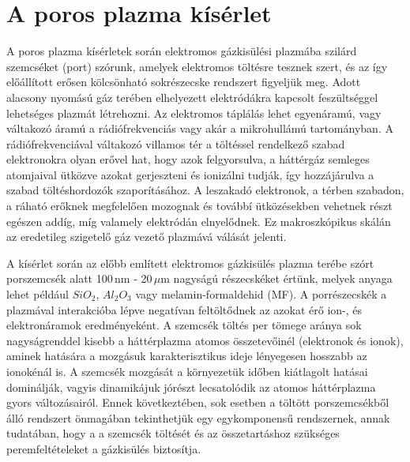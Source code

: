 \chapter{A poros plazma kísérlet}


	A poros plazma kísérletek során elektromos gázkisülési
        plazmába szilárd szemcséket (port) szórunk, amelyek
        elektromos töltésre tesznek szert, és az így
        előállított erősen kölcsönható sokrészecske rendszert
        figyeljük meg. Adott alacsony nyomású gáz terében elhelyezett
        elektródákra kapcsolt feszültséggel  
	lehetséges plazmát létrehozni. Az elektromos táplálás lehet
        egyenáramú, vagy váltakozó áramú a rádiófrekvenciás vagy akár
        a mikrohullámú tartományban. A rádiófrekvenciával váltakozó
        villamos tér a töltéssel rendelkező szabad elektronokra 
	olyan erővel hat, hogy azok felgyorsulva, a háttérgáz semleges
        atomjaival ütközve azokat gerjeszteni és ionizálni tudják, így
        hozzájárulva a szabad töltéshordozók szaporításához.
	A leszakadó elektronok, a térben szabadon, a ráható erőknek
        megfelelően mozognak és továbbí ütközésekben vehetnek részt
        egészen addíg, míg valamely elektródán elnyelődnek.
	Ez makroszkópikus skálán az eredetileg szigetelő gáz vezető
        plazmává válását jelenti.  

        A kísérlet során az előbb említett elektromos gázkisülés plazma terébe szórt porszemcsék alatt
	100\,nm - 20\,$\mu$m nagyságú részecskéket értünk, melyek anyaga
        lehet például $SiO_2$, $Al_2O_3$ vagy 
	melamin-formaldehid (MF). A porrészecskék a plazmával
        interakcióba lépve negatívan feltöltődnek az azokat érő ion-,
        és elektronáramok eredményeként. A szemcsék töltés per tömege
        aránya sok nagyságrenddel kisebb a háttérplazma atomos
        összetevőinél (elektronok és ionok),
        aminek hatására a mozgásuk karakterisztikus ideje lényegesen
        hosszabb az ionokénál is. A szemcsék
        mozgását a környezetük időben kiátlagolt hatásai dominálják,
        vagyis dinamikájuk jórészt lecsatolódik az atomos háttérplazma
        gyors változásairól. Ennek következtében, sok esetben a
        töltött porszemcsékből álló rendszert önmagában tekinthetjük
        egy egykomponensű rendszernek, annak tudatában, hogy a
        a szemcsék töltését és az összetartáshoz szükséges
        peremfeltételeket a gázkisülés biztosítja.

